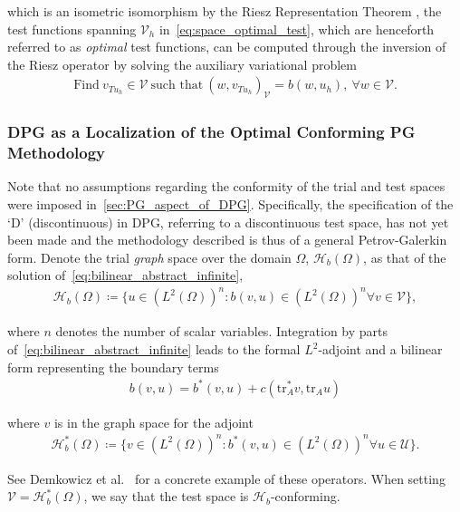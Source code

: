 which is an isometric isomorphism by the Riesz Representation Theorem , the test functions
spanning $\mathcal{V}_h$ in~\eqref{eq:space_optimal_test}, which are henceforth referred to as \emph{optimal} test
functions, can be computed through the inversion of the Riesz operator by solving the auxiliary variational problem
\begin{align} \label{eq:auxiliary_opt_v}
\text{Find}\ v_{T u_h} \in \mathcal{V}\ \text{such that}\
(w,v_{T u_h})_{\mathcal{V}} = b(w,u_h),\ \forall w \in \mathcal{V}.
\end{align}

\subsubsection{DPG as a Localization of the Optimal Conforming PG Methodology}

Note that no assumptions regarding the conformity of the trial and test spaces were imposed
in~\autoref{sec:PG_aspect_of_DPG}. Specifically, the specification of the `D' (discontinuous) in DPG, referring to a
discontinuous test space, has not yet been made and the methodology described is thus of a general Petrov-Galerkin
form. Denote the trial \emph{graph} space over the domain $\Omega$, $\mathcal{H}_b(\Omega)$, as that of the solution
of~\eqref{eq:bilinear_abstract_infinite},
\begin{align}
\mathcal{H}_b(\Omega) \coloneqq
\{ u \in (L^2(\Omega))^n : b(v,u) \in (L^2(\Omega))^n \forall v \in \mathcal{V} \},
\end{align}

where $n$ denotes the number of scalar variables. Integration by parts of~\eqref{eq:bilinear_abstract_infinite} leads to
the formal $L^2$-adjoint and a bilinear form representing the boundary terms
\begin{align}
b(v,u) = b^*(v,u) + c(\text{tr}_A^* v, \text{tr}_A u)
\end{align}

where $v$ is in the graph space for the adjoint
\begin{align}
\mathcal{H}_b^*(\Omega) \coloneqq
\{ v \in (L^2(\Omega))^n : b^*(v,u) \in (L^2(\Omega))^n \forall u \in \mathcal{U} \}.
\end{align}

See Demkowicz et al.~\cite[eq. ()]{Demkowicz2014_overview} for a concrete example of these operators.
When setting $\mathcal{V} = \mathcal{H}_b^*(\Omega)$, we say that the test space is $\mathcal{H}_b$-conforming.
\\~

